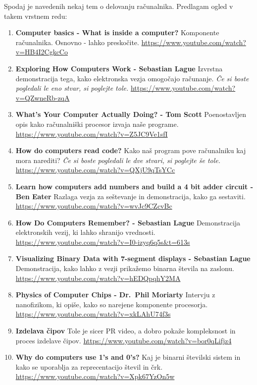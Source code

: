\documentclass[
]{report}
\begin{document}
Spodaj je navedenih nekaj tem o delovanju računalnika. Predlagam ogled v takem vrstnem redu:

\begin{enumerate}
\def\labelenumi{\arabic{enumi}.}
\item
  \textbf{Computer basics - What is inside a computer?}
  Komponente računalnika. Osnovno - lahko preskočite.
  \url{https://www.youtube.com/watch?v=HB4I2CgkcCo}
\item
  \textbf{Exploring How Computers Work - Sebastian Lague}
  Izvrstna demonstracija tega, kako elektronska vezja omogočajo računanje. \emph{Če si boste pogledali le eno stvar, si poglejte tole.}
  \url{https://www.youtube.com/watch?v=QZwneRb-zqA}
\item
  \textbf{What's Your Computer Actually Doing? - Tom Scott}
  Poenostavljen opis kako računalniški procesor izvaja naše programe.
  \url{https://www.youtube.com/watch?v=Z5JC9Ve1sfI}
\item
  \textbf{How do computers read code?}
  Kako naš program pove računalniku kaj mora narediti? \emph{Če si boste pogledali le dve stvari, si poglejte še tole.}
  \url{https://www.youtube.com/watch?v=QXjU9qTsYCc}
\item
  \textbf{Learn how computers add numbers and build a 4 bit adder circuit - Ben Eater}
  Razlaga vezja za seštevanje in demonstracija, kako ga sestaviti.
  \url{https://www.youtube.com/watch?v=wvJc9CZcvBc}
\item
  \textbf{How Do Computers Remember? - Sebastian Lague}
  Demonstracija elektronskih vezij, ki lahko shranijo vrednosti.
  \url{https://www.youtube.com/watch?v=I0-izyq6q5s\&t=613s}
\item
  \textbf{Visualizing Binary Data with 7-segment displays - Sebastian Lague}
  Demonstracija, kako lahko z vezji prikažemo binarna števila na zaslonu.
  \url{https://www.youtube.com/watch?v=hEDQpqhY2MA}
\item
  \textbf{Physics of Computer Chips - Dr.~Phil Moriarty}
  Intervju z nanofizikom, ki opiše, kako so narejene komponente procesorja.
  \url{https://www.youtube.com/watch?v=xkLAhU74f3s}
\item
  \textbf{Izdelava čipov}
  Tole je sicer PR video, a dobro pokaže kompleksnost in proces izdelave čipov.
  \url{https://www.youtube.com/watch?v=bor0qLifjz4}
\item
  \textbf{Why do computers use 1's and 0's?}
  Kaj je binarni številski sistem in kako se uporablja za reprecentacijo števil in črk.
  \url{https://www.youtube.com/watch?v=Xpk67YzOn5w}
\end{enumerate}
\end{document}
